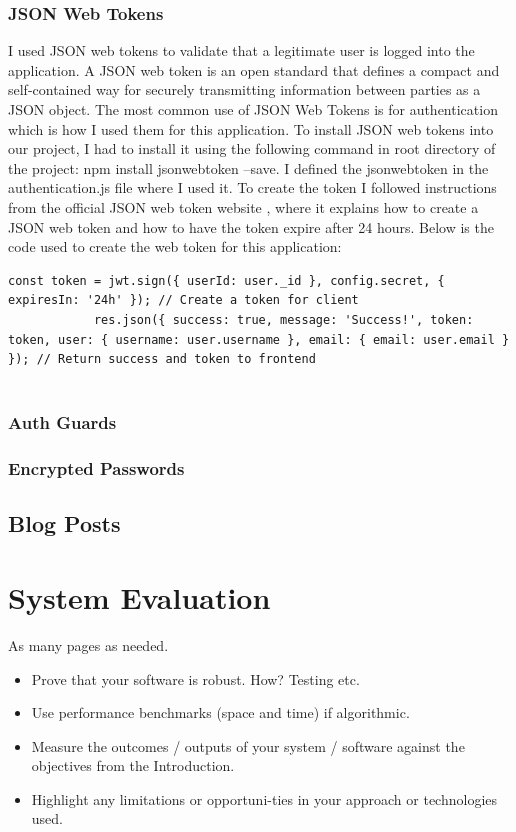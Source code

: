 \subsection{JSON Web Tokens}
I used JSON web tokens to validate that a legitimate user is logged into the application. A JSON web token is an open standard that defines a compact and self-contained way for securely transmitting information between parties as a JSON object. The most common use of JSON Web Tokens is for authentication which is how I used them for this application\cite{JSONWebT11}. To install JSON web tokens into our project, I had to install it using the following command in root directory of the project: npm install jsonwebtoken --save. I defined the jsonwebtoken in the authentication.js file where I used it. To create the token I followed instructions from the official JSON web token website \cite{jsonwebt54}, where it explains how to create a JSON web token and how to have the token expire after 24 hours. Below is the code used to create the web token for this application:
\begin{lstlisting}
const token = jwt.sign({ userId: user._id }, config.secret, { expiresIn: '24h' }); // Create a token for client
            res.json({ success: true, message: 'Success!', token: token, user: { username: user.username }, email: { email: user.email } }); // Return success and token to frontend
  
\end{lstlisting}

\subsection{Auth Guards}

\subsection{Encrypted Passwords}

\section{Blog Posts}







\chapter{System Evaluation}
As many pages as needed.
\begin{itemize}
\item Prove that your software is robust. How? Testing etc. 
\item Use performance benchmarks (space and time) if algorithmic.
\item Measure the outcomes / outputs of your system / software against the objectives from the Introduction.
\item Highlight any limitations or opportuni-ties in your approach or technologies used.
\end{itemize}

